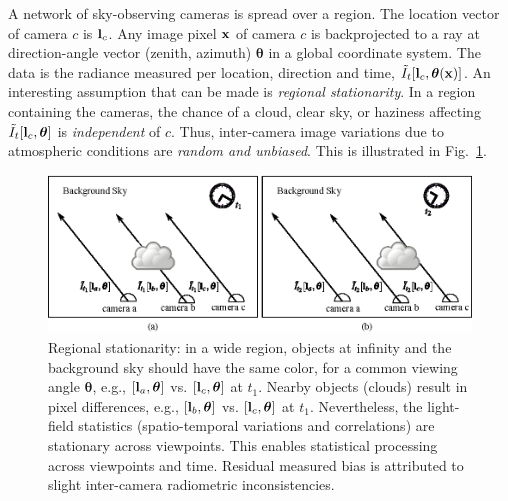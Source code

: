 \documentclass[runningheads]{llncs}
\begin{document}
A network of sky-observing cameras is spread over a region. The location vector of camera $c$ is ${\bf l}_c$. Any image pixel ${\bf x}$ of camera $c$ is backprojected to a ray at direction-angle vector (zenith, azimuth) ${\bm \theta}$ in a global coordinate system. The data is the radiance measured per location, direction and time, $\tilde I_t[{\bf l}_c,{\bm \theta}(\bf x)]$.
An interesting assumption that can be made is {\em regional stationarity}. In a region containing the cameras, the chance of a cloud, clear sky, or haziness affecting $\tilde I_t[{\bf l}_c,{\bm \theta}]$ is {\em independent} of $c$. Thus, inter-camera image variations due to atmospheric conditions are {\em random and unbiased}. This is illustrated in Fig.~\ref{fig:station}.
\begin{figure}[t!]
  \begin{center}
    \includegraphics[width=\linewidth]{figures/regional_stationarity.eps}
  \end{center}
  \vspace{-0.6cm}
  \caption{  %
    Regional stationarity: in a wide
    region, objects at infinity and the background
    sky should have the same color, for a common viewing angle ${\bm
      \theta}$, e.g.,
    $[{\bf l}_a,{\bm \theta}]$ vs. $[{\bf l}_c,{\bm \theta}]$ at $t_1$.
    Nearby objects (clouds) result in pixel differences, e.g.,
    $[{\bf l}_b,{\bm \theta}]$ vs. $[{\bf l}_c,{\bm \theta}]$ at $t_1$.
    Nevertheless, the light-field statistics (spatio-temporal variations and correlations) are stationary across viewpoints. This enables statistical processing  across viewpoints and time.  Residual measured bias is
    attributed to slight inter-camera radiometric inconsistencies.  }
  \label{fig:station}
\end{figure}
\end{document}
